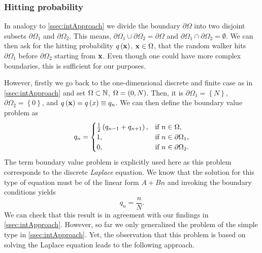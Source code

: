 \subsubsection{Hitting probability}\label{sssec:hitting-prob}
In analogy to \ref{ssec:intApproach} we divide the boundary $\partial\Omega$ into two disjoint subsets $\partial\Omega_1$ and $\partial\Omega_2$. This means, $\partial\Omega_1\cup\partial\Omega_2=\partial\Omega$ and \mbox{$\partial\Omega_1\cap\partial\Omega_2=\emptyset$}. We can then ask for the hitting probability $q\left(\mathbf{x}\right)$, $\mathbf{x}\in\Omega$, \ie that the random walker hits $\partial\Omega_1$ before $\partial\Omega_2$ starting from $\mathbf{x}$. Even though one could have more complex boundaries, this is sufficient for our purposes.

However, firstly we go back to the one-dimensional discrete and finite case as in \ref{ssec:intApproach} and set $\Omega \subset \operatorname{\mathbb{N}}$, $\Omega=\left(0,N\right)$. Then, it is $\partial\Omega_1=\left\{N\right\}$, $\partial\Omega_2=\left\{0\right\}$, and $q\left(\mathbf{x}\right) = q\left(x\right) \equiv q_n$. We can then define the boundary value problem as
\begin{equation*}
 q_n =
 \begin{cases}
  \frac{1}{2}\left(q_{n-1}+q_{n+1}\right), & \textrm{if }n\in\Omega,\\
  1, & \textrm{if }n\in\partial\Omega_1,\\
  0, & \textrm{if }n\in\partial\Omega_2.
 \end{cases}
\end{equation*}
The term boundary value problem is explicitly used here as this problem corresponds to the discrete \textit{Laplace} equation. We know that the solution for this type of equation must be of the linear form $A+Bn$ and invoking the boundary conditions yields
\begin{equation*}
 q_n = \frac{n}{N}.
\end{equation*}
We can check that this result is in agreement with our findings in \autoref{ssec:intApproach}. However, so far we only generalized the problem of the simple type in \ref{ssec:intApproach}. Yet, the observation that this problem is based on solving the Laplace equation leads to the following approach.

\bigskip

